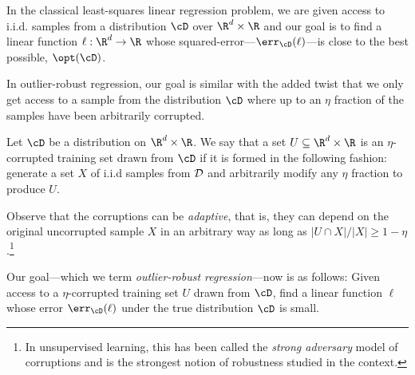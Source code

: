 In the classical least-squares linear regression problem, we are given access to i.i.d. samples from a distribution $\cD$ over $\R^d \times \R$ and our goal is to find a linear function $\ell:\R^d \to \R$ whose squared-error---$\err_{\cD}(\ell)$---is close to the best possible, $\opt(\cD)$. 

In outlier-robust regression, our goal is similar with the added twist that we only get access to a sample from the distribution $\cD$ where up to an $\eta$ fraction of the samples have been arbitrarily corrupted.
\begin{definition}
Let $\cD$ be a distribution on $\R^d \times \R$. We say that a set $U \subseteq \R^d \times \R$ is an $\eta$-corrupted training set drawn from $\cD$ if it is formed in the
following fashion: generate a set $X$ of i.i.d samples from ${\cal D}$ and arbitrarily modify any $\eta$ fraction to produce $U$. %
\end{definition}
Observe that the corruptions can be \emph{adaptive}, that is, they can depend on the original uncorrupted sample $X$ in an arbitrary way as long as $|U \cap X | /|X| \geq 1 - \eta$.\footnote{In unsupervised learning, this has been called the \emph{strong adversary} model of corruptions and is the strongest notion of robustness studied in the context.}

Our goal---which we term \emph{outlier-robust regression}---now is as follows: Given access to a $\eta$-corrupted training set $U$ drawn from $\cD$, find a linear function $\ell$ whose error $\err_{\cD}(\ell)$ under the true distribution $\cD$ is small. 




